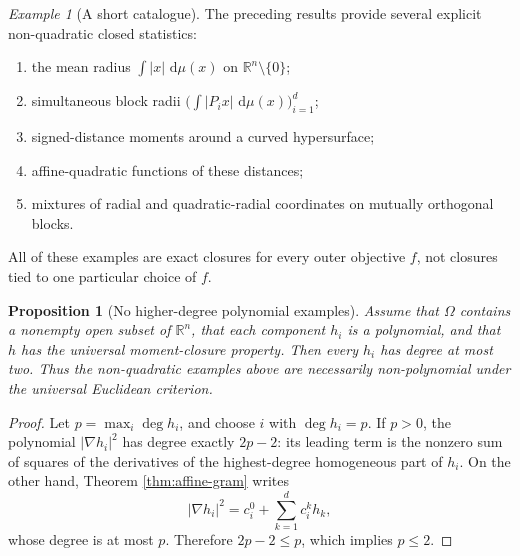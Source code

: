 \documentclass[11pt]{article}
\newcommand{\R}{\mathbb R}
\newcommand{\dd}{\,\mathrm d}
\newtheorem{proposition}{Proposition}
\theoremstyle{remark}
\newtheorem{example}{Example}
\begin{document}
\begin{example}[A short catalogue]
The preceding results provide several explicit non-quadratic closed
statistics:
\begin{enumerate}
  \item the mean radius \(\int|x|\,\dd\mu(x)\) on
  \(\R^n\setminus\{0\}\);
  \item simultaneous block radii
  \(\bigl(\int|P_i x|\,\dd\mu(x)\bigr)_{i=1}^d\);
  \item signed-distance moments around a curved hypersurface;
  \item affine-quadratic functions of these distances;
  \item mixtures of radial and quadratic-radial coordinates on mutually
  orthogonal blocks.
\end{enumerate}
All of these examples are exact closures for every outer objective \(f\),
not closures tied to one particular choice of \(f\).
\end{example}

\begin{proposition}[No higher-degree polynomial examples]
\label{prop:no-higher-polynomial}
Assume that \(\Omega\) contains a nonempty open subset of \(\R^n\), that
each component \(h_i\) is a polynomial, and that \(h\) has the universal
moment-closure property.  Then every \(h_i\) has degree at most two.  Thus
the non-quadratic examples above are necessarily non-polynomial under the
universal Euclidean criterion.
\end{proposition}

\begin{proof}
Let \(p=\max_i\deg h_i\), and choose \(i\) with \(\deg h_i=p\).  If
\(p>0\), the polynomial \(|\nabla h_i|^2\) has degree exactly \(2p-2\):
its leading term is the nonzero sum of squares of the derivatives of the
highest-degree homogeneous part of \(h_i\).  On the other hand, Theorem
\ref{thm:affine-gram} writes
\[
  |\nabla h_i|^2
  =
  c_i^0+\sum_{k=1}^d c_i^k h_k,
\]
whose degree is at most \(p\).  Therefore \(2p-2\leq p\), which implies
\(p\leq2\).
\end{proof}
\end{document}
